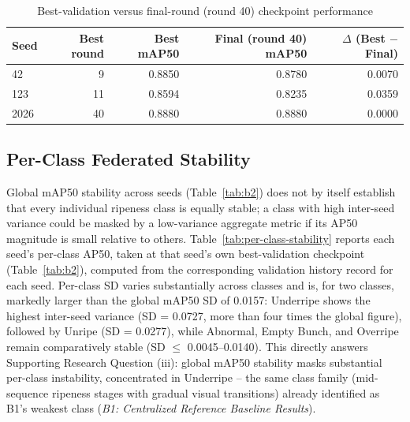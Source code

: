 \documentclass[11pt]{article}
\begin{document}
\begin{table}[H]
  \centering
  \caption{Best-validation versus final-round (round 40) checkpoint performance}
  \label{tab:best-final}
  \begin{tabular}{lrrrr}
    \toprule
    Seed & Best round & Best mAP50 & Final (round 40) mAP50 & $\Delta$ (Best $-$ Final) \\
    \midrule
    42   & 9  & 0.8850 & 0.8780 & 0.0070 \\
    123  & 11 & 0.8594 & 0.8235 & 0.0359 \\
    2026 & 40 & 0.8880 & 0.8880 & 0.0000 \\
    \bottomrule
  \end{tabular}
\end{table}

\subsection{Per-Class Federated Stability}
Global mAP50 stability across seeds (Table~\ref{tab:b2}) does not by itself establish that every individual ripeness class is equally stable; a class with high inter-seed variance could be masked by a low-variance aggregate metric if its AP50 magnitude is small relative to others. Table~\ref{tab:per-class-stability} reports each seed's per-class AP50, taken at that seed's own best-validation checkpoint (Table~\ref{tab:b2}), computed from the corresponding validation history record for each seed. Per-class SD varies substantially across classes and is, for two classes, markedly larger than the global mAP50 SD of 0.0157: Underripe shows the highest inter-seed variance (SD = 0.0727, more than four times the global figure), followed by Unripe (SD = 0.0277), while Abnormal, Empty Bunch, and Overripe remain comparatively stable (SD $\le$ 0.0045--0.0140). This directly answers Supporting Research Question (iii): global mAP50 stability masks substantial per-class instability, concentrated in Underripe -- the same class family (mid-sequence ripeness stages with gradual visual transitions) already identified as B1's weakest class (\emph{B1: Centralized Reference Baseline Results}).
\end{document}
